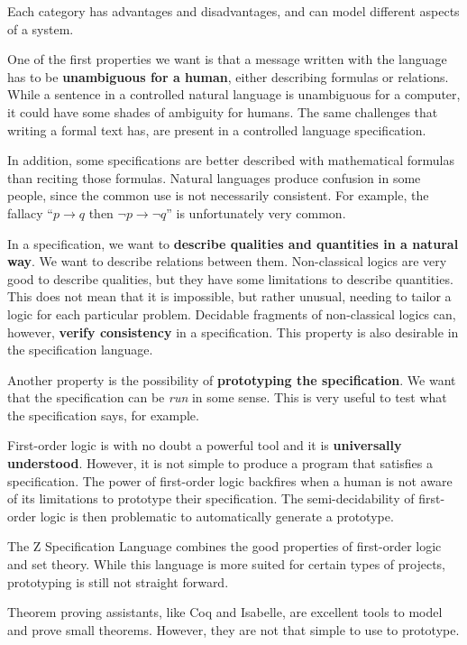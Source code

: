 Each category has advantages and disadvantages, and can model different aspects of a system.

One of the first properties we want is that a message written with the language has to be \textbf{unambiguous for a human}, either describing formulas or relations.
While a sentence in a controlled natural language is unambiguous for a computer, it could have some shades of ambiguity for humans.
The same challenges that writing a formal text has, are present in a controlled language specification.

In addition, some specifications are better described with mathematical formulas than reciting those formulas.
Natural languages produce confusion in some people, since the common use is not necessarily consistent.
For example, the fallacy ``$p \to q$ then $\lnot p \to \lnot q$'' is unfortunately very common.

In a specification, we want to \textbf{describe qualities and quantities in a natural way}.
We want to describe relations between them.
Non-classical logics are very good to describe qualities, but they have some limitations to describe quantities.
This does not mean that it is impossible, but rather unusual, needing to tailor a logic for each particular problem.
Decidable fragments of non-classical logics can, however, \textbf{verify consistency} in a specification.
This property is also desirable in the specification language.

Another property is the possibility of \textbf{prototyping the specification}.
We want that the specification can be \textit{run} in some sense.
This is very useful to test what the specification says, for example.

First-order logic is with no doubt a powerful tool and it is \textbf{universally understood}.
However, it is not simple to produce a program that satisfies a specification.
The power of first-order logic backfires when a human is not aware of its limitations to prototype their specification.
The semi-decidability of first-order logic is then problematic to automatically generate a prototype.

The Z Specification Language combines the good properties of first-order logic and set theory.
While this language is more suited for certain types of projects, prototyping is still not straight forward.

Theorem proving assistants, like Coq and Isabelle, are excellent tools to model and prove small theorems.
However, they are not that simple to use to prototype.

